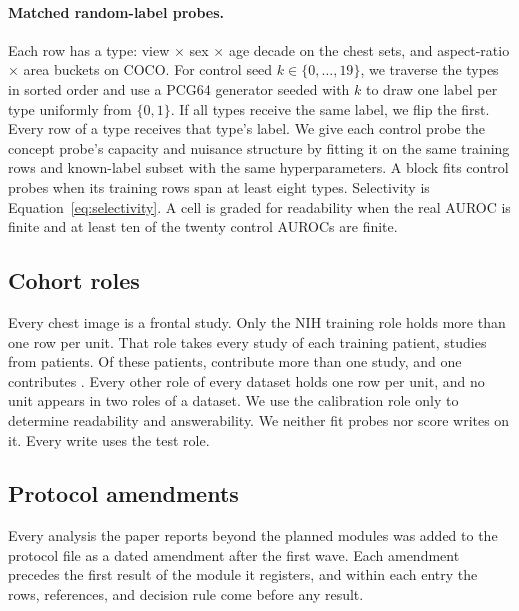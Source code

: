 \paragraph{Matched random-label probes.} Each row has a type: view $\times$ sex $\times$ age decade on the chest sets, and aspect-ratio $\times$ area buckets on COCO. For control seed $k\in\{0,\dots,19\}$, we traverse the types in sorted order and use a PCG64 generator seeded with $k$ to draw one label per type uniformly from $\{0,1\}$. If all types receive the same label, we flip the first. Every row of a type receives that type's label. We give each control probe the concept probe's capacity and nuisance structure by fitting it on the same training rows and known-label subset with the same hyperparameters. A block fits control probes when its training rows span at least eight types. Selectivity is Equation~\ref{eq:selectivity}. A cell is graded for readability when the real AUROC is finite and at least ten of the twenty control AUROCs are finite.

\subsection{Cohort roles}
\label{app:repro-cohorts}

Every chest image is a frontal study. Only the NIH training role holds more than one row per unit. That role takes every study of each training patient, \cfCohortNihTrainRows{} studies from \cfCohortNihTrainUnits{} patients. Of these patients, \cfCohortNihTrainMulti{} contribute more than one study, and one contributes \cfCohortNihTrainMax{}. Every other role of every dataset holds one row per unit, and no unit appears in two roles of a dataset. We use the calibration role only to determine readability and answerability. We neither fit probes nor score writes on it. Every write uses the test role.

\FloatBarrier

\subsection{Protocol amendments}
\label{app:repro-protocol}

Every analysis the paper reports beyond the \cfCoveragePlannedWord{} planned modules was added to the protocol file as a dated amendment after the first wave. Each amendment precedes the first result of the module it registers, and within each entry the rows, references, and decision rule come before any result.


